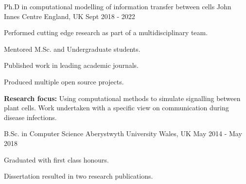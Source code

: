 

\begin{cventries}

  \cventry
    {Ph.D in computational modelling of information transfer between cells} %
    {John Innes Centre} %
    {England, UK} %
    {Sept 2018 - 2022} %
    {
      \begin{cvitems} %
        \item {Performed cutting edge research as part of a multidisciplinary team.}
        \item {Mentored M.Sc. and Undergraduate students.}
        \item {Published work in leading academic journals.}
        \item {Produced multiple open source projects.}
        \item {\textbf{Research focus:} Using computational methods to simulate signalling between plant cells. Work undertaken with a specific view on communication during disease infections.}
      \end{cvitems}
    }
    
  \cventry
    {B.Sc. in Computer Science} %
    {Aberystwyth University} %
    {Wales, UK} %
    {May 2014 - May 2018} %
    {
      \begin{cvitems} %
        \item {Graduated with first class honours.}
        \item {Dissertation resulted in two research publications.} 
      \end{cvitems}
    }

\end{cventries}

